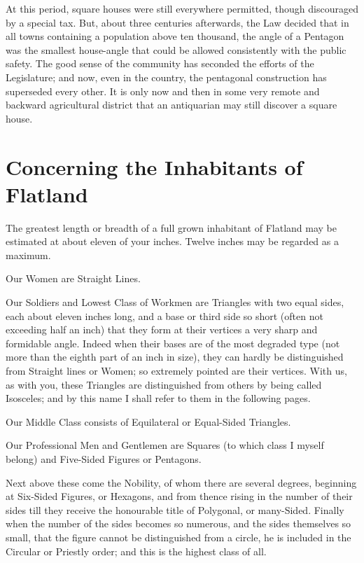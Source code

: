 \documentclass[12pt, a4paper, twoside]{memoir}
\begin{document}
At this period, square houses were still everywhere permitted, though
discouraged by a special tax. But, about three centuries afterwards, the Law
decided that in all towns containing a population above ten thousand, the
angle of a Pentagon was the smallest house-angle that could be allowed
consistently with the public safety. The good sense of the community has
seconded the efforts of the Legislature; and now, even in the country, the
pentagonal construction has superseded every other. It is only now and then in
some very remote and backward agricultural district that an antiquarian may
still discover a square house.













\chapter{Concerning the Inhabitants of Flatland}
The greatest length or breadth of a full grown inhabitant of Flatland may be
estimated at about eleven of your inches. Twelve inches may be regarded as a
maximum.

Our Women are Straight Lines.

Our Soldiers and Lowest Class of Workmen are Triangles with two equal sides,
each about eleven inches long, and a base or third side so short (often not
exceeding half an inch) that they form at their vertices a very sharp and
formidable angle. Indeed when their bases are of the most degraded type (not
more than the eighth part of an inch in size), they can hardly be
distinguished from Straight lines or Women; so extremely pointed are their
vertices. With us, as with you, these Triangles are distinguished from others
by being called Isosceles; and by this name I shall refer to them in the
following pages.

Our Middle Class consists of Equilateral or Equal-Sided Triangles.

Our Professional Men and Gentlemen are Squares (to which class I myself
belong) and Five-Sided Figures or Pentagons.

Next above these come the Nobility, of whom there are several degrees,
beginning at Six-Sided Figures, or Hexagons, and from thence rising in the
number of their sides till they receive the honourable title of Polygonal, or
many-Sided. Finally when the number of the sides becomes so numerous, and the
sides themselves so small, that the figure cannot be distinguished from a
circle, he is included in the Circular or Priestly order; and this is the
highest class of all.
\end{document}
